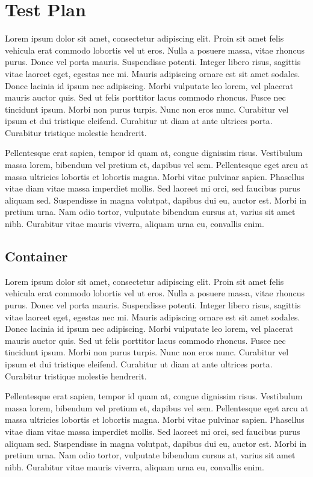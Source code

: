 \documentclass{vitmsprojectreport}
\begin{document}
\section{Test Plan}

Lorem ipsum dolor sit amet, consectetur adipiscing elit. Proin sit amet felis vehicula erat commodo lobortis vel ut eros. Nulla a posuere massa, vitae rhoncus purus. Donec vel porta mauris. Suspendisse potenti. Integer libero risus, sagittis vitae laoreet eget, egestas nec mi. Mauris adipiscing ornare est sit amet sodales. Donec lacinia id ipsum nec adipiscing. Morbi vulputate leo lorem, vel placerat mauris auctor quis. Sed ut felis porttitor lacus commodo rhoncus. Fusce nec tincidunt ipsum. Morbi non purus turpis. Nunc non eros nunc. Curabitur vel ipsum et dui tristique eleifend. Curabitur ut diam at ante ultrices porta. Curabitur tristique molestie hendrerit.

Pellentesque erat sapien, tempor id quam at, congue dignissim risus. Vestibulum massa lorem, bibendum vel pretium et, dapibus vel sem. Pellentesque eget arcu at massa ultricies lobortis et lobortis magna. Morbi vitae pulvinar sapien. Phasellus vitae diam vitae massa imperdiet mollis. Sed laoreet mi orci, sed faucibus purus aliquam sed. Suspendisse in magna volutpat, dapibus dui eu, auctor est. Morbi in pretium urna. Nam odio tortor, vulputate bibendum cursus at, varius sit amet nibh. Curabitur vitae mauris viverra, aliquam urna eu, convallis enim.

\subsection{Container}

Lorem ipsum dolor sit amet, consectetur adipiscing elit. Proin sit amet felis vehicula erat commodo lobortis vel ut eros. Nulla a posuere massa, vitae rhoncus purus. Donec vel porta mauris. Suspendisse potenti. Integer libero risus, sagittis vitae laoreet eget, egestas nec mi. Mauris adipiscing ornare est sit amet sodales. Donec lacinia id ipsum nec adipiscing. Morbi vulputate leo lorem, vel placerat mauris auctor quis. Sed ut felis porttitor lacus commodo rhoncus. Fusce nec tincidunt ipsum. Morbi non purus turpis. Nunc non eros nunc. Curabitur vel ipsum et dui tristique eleifend. Curabitur ut diam at ante ultrices porta. Curabitur tristique molestie hendrerit.

Pellentesque erat sapien, tempor id quam at, congue dignissim risus. Vestibulum massa lorem, bibendum vel pretium et, dapibus vel sem. Pellentesque eget arcu at massa ultricies lobortis et lobortis magna. Morbi vitae pulvinar sapien. Phasellus vitae diam vitae massa imperdiet mollis. Sed laoreet mi orci, sed faucibus purus aliquam sed. Suspendisse in magna volutpat, dapibus dui eu, auctor est. Morbi in pretium urna. Nam odio tortor, vulputate bibendum cursus at, varius sit amet nibh. Curabitur vitae mauris viverra, aliquam urna eu, convallis enim.
\end{document}
